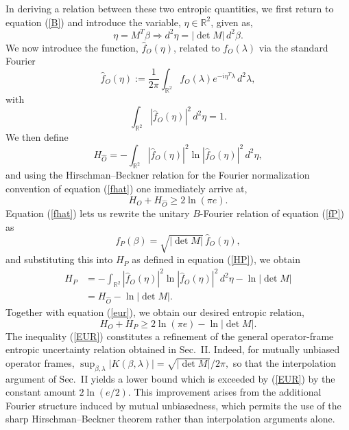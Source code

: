 \documentclass[aps,pra,onecolumn,nofootinbib,superscriptaddress,showpacs]{revtex4}
\begin{document}
In deriving a relation between these two entropic quantities, we first return to equation (\ref{B})
and introduce the variable, $\eta\in \mathbb{R}^2$, given as,
\begin{equation}
\eta=M^T\beta \Rightarrow d^2\eta=|\det M|\,d^2\beta.
\end{equation}
We now introduce the function, $\widehat{f}_O(\eta)$, related to $f_O(\lambda)$ via the standard Fourier
\begin{equation}\label{fhat}
\widehat{f}_O(\eta)
:=
\frac{1}{2\pi}
\int_{\mathbb R^2}
f_O(\lambda)
e^{-i\eta^T\lambda}
\,d^2\lambda,
\end{equation}
with
\begin{equation}
\int_{\mathbb R^2}
|\widehat{f}_O(\eta)|^2
\,d^2\eta=1.
\end{equation}
 We then define
 \begin{equation}
H_{\widehat{O}}
=
-\int_{\mathbb R^2}
|\widehat{f}_O(\eta)|^2\ln |\hat{f}_O(\eta)|^2\,
d^2\eta,
\end{equation}
and
using the Hirschman--Beckner relation \cite{Hirschman1957,Beckner1975,Bialynicki1975} for the Fourier normalization convention of equation (\ref{fhat}) one immediately arrive at,
 \begin{equation}\label{eur}
H_O+H_{\widehat O}
\ge
2\ln(\pi e).
\end{equation}
Equation (\ref{fhat}) lets us rewrite the unitary \(B\)-Fourier relation of equation (\ref{fP}) as
 \begin{equation}
f_P(\beta)
=
\sqrt{|\det M|}\,\widehat f_O(\eta),
\end{equation}
and substituting this into $H_P$ as defined in equation (\ref{HP}), we obtain
\begin{align}
H_P
&=
-\int_{\mathbb R^2}
|\widehat f_O(\eta)|^2
\ln |\widehat f_O(\eta)|^2
\,d^2\eta
-
\ln|\det M|\nonumber\\
&=H_{\widehat O}
-
\ln|\det M|.
\end{align}
Together with equation (\ref{eur}), we obtain our desired entropic relation,
\begin{equation}\label{EUR}
H_O+H_P
\ge
2\ln(\pi e)-\ln|\det M|.
\end{equation}
%
%
The inequality (\ref{EUR}) constitutes a refinement of the general
operator-frame entropic uncertainty relation obtained in Sec.~II.
Indeed, for mutually unbiased operator frames,
$
\sup_{\beta,\lambda}|K(\beta,\lambda)|
=
\sqrt{|\det M|}/2\pi,
$
so that the interpolation argument of Sec.~II yields a lower bound
which is exceeded by (\ref{EUR}) by the constant amount
$
2\ln\!\left(e/2\right).
$
This improvement arises from the additional Fourier structure induced
by mutual unbiasedness, which permits the use of the sharp
Hirschman--Beckner theorem rather than interpolation arguments alone.
\end{document}
